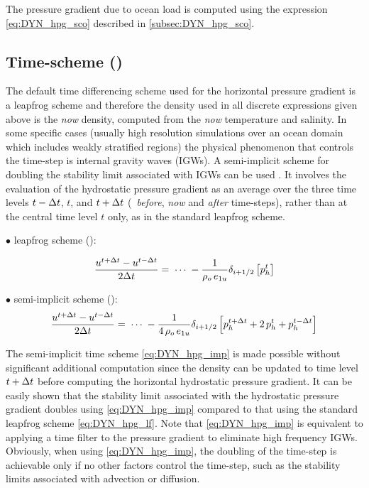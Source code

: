 \documentclass[../main/NEMO_manual]{subfiles}
\begin{document}
The pressure gradient due to ocean load is computed using the expression \autoref{eq:DYN_hpg_sco} described in
\autoref{subsec:DYN_hpg_sco}.

\subsection[Time-scheme (\forcode{ln_dynhpg_imp})]{Time-scheme (\protect{})}
\label{subsec:DYN_hpg_imp}

The default time differencing scheme used for the horizontal pressure gradient is a leapfrog scheme and
therefore the density used in all discrete expressions given above is the  \textit{now} density,
computed from the \textit{now} temperature and salinity.
In some specific cases
(usually high resolution simulations over an ocean domain which includes weakly stratified regions)
the physical phenomenon that controls the time-step is internal gravity waves (IGWs).
A semi-implicit scheme for doubling the stability limit associated with IGWs can be used
\citep{brown.campana_MWR78, maltrud.smith.ea_JGR98}.
It involves the evaluation of the hydrostatic pressure gradient as
an average over the three time levels $t-\Delta t$, $t$, and $t+\Delta t$
(\ie\ \textit{before}, \textit{now} and  \textit{after} time-steps),
rather than at the central time level $t$ only, as in the standard leapfrog scheme.

$\bullet$ leapfrog scheme ():

\begin{equation}
  \label{eq:DYN_hpg_lf}
  \frac{u^{t+\Delta t}-u^{t-\Delta t}}{2\Delta t} = \;\cdots \;
  -\frac{1}{\rho_o \,e_{1u} }\delta_{i+1/2} \left[ {p_h^t } \right]
\end{equation}

$\bullet$ semi-implicit scheme ():
\begin{equation}
  \label{eq:DYN_hpg_imp}
  \frac{u^{t+\Delta t}-u^{t-\Delta t}}{2\Delta t} = \;\cdots \;
  -\frac{1}{4\,\rho_o \,e_{1u} } \delta_{i+1/2} \left[ p_h^{t+\Delta t} +2\,p_h^t +p_h^{t-\Delta t}  \right]
\end{equation}

The semi-implicit time scheme \autoref{eq:DYN_hpg_imp} is made possible without
significant additional computation since the density can be updated to time level $t+\Delta t$ before
computing the horizontal hydrostatic pressure gradient.
It can be easily shown that the stability limit associated with the hydrostatic pressure gradient doubles using
\autoref{eq:DYN_hpg_imp} compared to that using the standard leapfrog scheme \autoref{eq:DYN_hpg_lf}.
Note that \autoref{eq:DYN_hpg_imp} is equivalent to applying a time filter to the pressure gradient to
eliminate high frequency IGWs.
Obviously, when using \autoref{eq:DYN_hpg_imp},
the doubling of the time-step is achievable only if no other factors control the time-step,
such as the stability limits associated with advection or diffusion.
\end{document}
